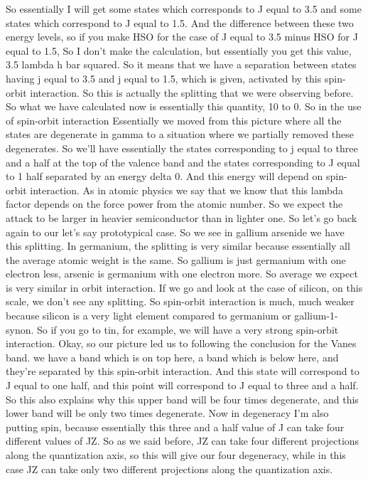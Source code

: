 So essentially I will get some states which corresponds to J equal to 3.5 and some states which correspond to J equal to 1.5. And the difference between these two energy levels, so if you make HSO for the case of J equal to 3.5 minus HSO for J equal to 1.5, So I don't make the calculation, but essentially you get this value, 3.5 lambda h bar squared. So it means that we have a separation between states having j equal to 3.5 and j equal to 1.5, which is given, activated by this spin-orbit interaction. So this is actually the splitting that we were observing before. So what we have calculated now is essentially this quantity, 10 to 0. So in the use of spin-orbit interaction Essentially we moved from this picture where all the states are degenerate in gamma to a situation where we partially removed these degenerates. So we'll have essentially the states corresponding to j equal to three and a half at the top of the valence band and the states corresponding to J equal to 1 half separated by an energy delta 0. And this energy will depend on spin-orbit interaction. As in atomic physics we say that we know that this lambda factor depends on the force power from the atomic number. So we expect the attack to be larger in heavier semiconductor than in lighter one. So let's go back again to our let's say prototypical case. So we see in gallium arsenide we have this splitting. In germanium, the splitting is very similar because essentially all the average atomic weight is the same. So gallium is just germanium with one electron less, arsenic is germanium with one electron more. So average we expect is very similar in orbit interaction. If we go and look at the case of silicon, on this scale, we don't see any splitting. So spin-orbit interaction is much, much weaker because silicon is a very light element compared to germanium or gallium-1-synon. So if you go to tin, for example, we will have a very strong spin-orbit interaction. Okay, so our picture led us to following the conclusion for the Vanes band. we have a band which is on top here, a band which is below here, and they're separated by this spin-orbit interaction. And this state will correspond to J equal to one half, and this point will correspond to J equal to three and a half. So this also explains why this upper band will be four times degenerate, and this lower band will be only two times degenerate. Now in degeneracy I'm also putting spin, because essentially this three and a half value of J can take four different values of JZ. So as we said before, JZ can take four different projections along the quantization axis, so this will give our four degeneracy, while in this case JZ can take only two different projections along the quantization axis.

